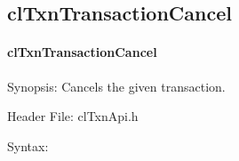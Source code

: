\begin{flushleft}
\subsection{clTxnTransactionCancel}
\hypertarget{pagetxn104}{}\paragraph{cl\-Txn\-Transaction\-Cancel}\label{pagetxn104}
\begin{Desc}
\item[Synopsis:]Cancels the given transaction.\end{Desc}
\begin{Desc}
\item[Header File:]clTxnApi.h\end{Desc}
\begin{Desc}
\item[Syntax:]


\end{Desc}
\end{flushleft}

